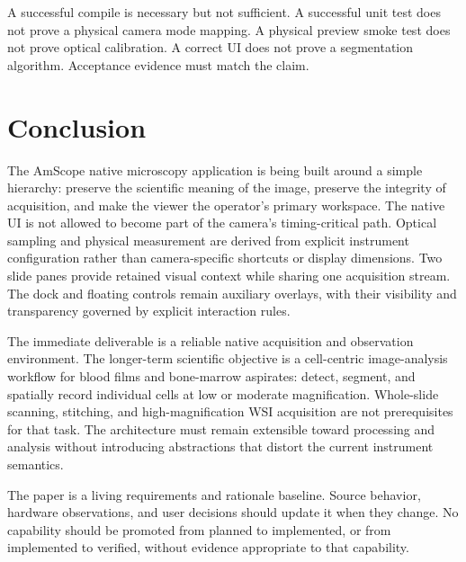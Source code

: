 \documentclass[11pt,a4paper,oneside]{article}
\begin{document}
A successful compile is necessary but not sufficient. A successful unit test does not prove a physical camera mode mapping. A physical preview smoke test does not prove optical calibration. A correct UI does not prove a segmentation algorithm. Acceptance evidence must match the claim.

\section{Conclusion}
The AmScope native microscopy application is being built around a simple hierarchy: preserve the scientific meaning of the image, preserve the integrity of acquisition, and make the viewer the operator's primary workspace. The native UI is not allowed to become part of the camera's timing-critical path. Optical sampling and physical measurement are derived from explicit instrument configuration rather than camera-specific shortcuts or display dimensions. Two slide panes provide retained visual context while sharing one acquisition stream. The dock and floating controls remain auxiliary overlays, with their visibility and transparency governed by explicit interaction rules.

The immediate deliverable is a reliable native acquisition and observation environment. The longer-term scientific objective is a cell-centric image-analysis workflow for blood films and bone-marrow aspirates: detect, segment, and spatially record individual cells at low or moderate magnification. Whole-slide scanning, stitching, and high-magnification WSI acquisition are not prerequisites for that task. The architecture must remain extensible toward processing and analysis without introducing abstractions that distort the current instrument semantics.

The paper is a living requirements and rationale baseline. Source behavior, hardware observations, and user decisions should update it when they change. No capability should be promoted from planned to implemented, or from implemented to verified, without evidence appropriate to that capability.

\appendix
\end{document}
